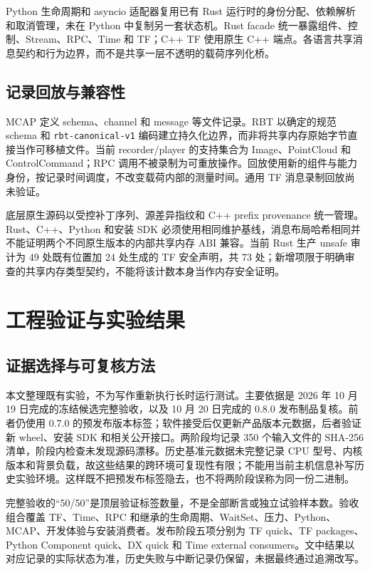 \documentclass[UTF8,fontset=none,zihao=-4,a4paper]{ctexart}
\newcommand{\code}[1]{\texttt{#1}}
\begin{document}
Python 生命周期和 asyncio 适配器复用已有 Rust 运行时的身份分配、依赖解析和取消管理，未在 Python 中复制另一套状态机。Rust facade 统一暴露组件、控制、Stream、RPC、Time 和 TF；C++ TF 使用原生 C++ 端点。各语言共享消息契约和行为边界，而不是共享一层不透明的载荷序列化桥。

\subsection{记录回放与兼容性}
MCAP 定义 schema、channel 和 message 等文件记录\cite{mcap}。RBT 以确定的规范 schema 和 \code{rbt-canonical-v1} 编码建立持久化边界，而非将共享内存原始字节直接当作可移植文件。当前 recorder/player 的支持集合为 Image、PointCloud 和 ControlCommand；RPC 调用不被录制为可重放操作。回放使用新的组件与能力身份，按记录时间调度，不改变载荷内部的测量时间。通用 TF 消息录制回放尚未验证\cite{rbtmcap}。

底层原生源码以受控补丁序列、源差异指纹和 C++ prefix provenance 统一管理。Rust、C++、Python 和安装 SDK 必须使用相同维护基线，消息布局哈希相同并不能证明两个不同原生版本的内部共享内存 ABI 兼容。当前 Rust 生产 unsafe 审计为 49 处既有位置加 24 处生成的 TF 安全声明，共 73 处；新增项限于明确审查的共享内存类型契约，不能将该计数本身当作内存安全证明\cite{rbtunsafe}。

\section{工程验证与实验结果}
\subsection{证据选择与可复核方法}
本文整理既有实验，不为写作重新执行长时运行测试。主要依据是 2026 年 10 月 19 日完成的冻结候选完整验收，以及 10 月 20 日完成的 0.8.0 发布制品复核\cite{rbtreport}。前者仍使用 0.7.0 的预发布版本标签；软件接受后仅更新产品版本元数据，后者验证新 wheel、安装 SDK 和相关公开接口。两阶段均记录 350 个输入文件的 SHA-256 清单，阶段内检查未发现源码漂移。历史基准元数据未完整记录 CPU 型号、内核版本和背景负载，故这些结果的跨环境可复现性有限；不能用当前主机信息补写历史实验环境。这样既不把预发布标签隐去，也不将两阶段误称为同一份二进制。

完整验收的“50/50”是顶层验证标签数量，不是全部断言或独立试验样本数。验收组合覆盖 TF、Time、RPC 和继承的生命周期、WaitSet、压力、Python、MCAP、开发体验与安装消费者。发布阶段五项分别为 TF quick、TF packages、Python Component quick、DX quick 和 Time external consumers。文中结果以对应记录的实际状态为准，历史失败与中断记录仍保留，未据最终通过追溯改写。
\end{document}
